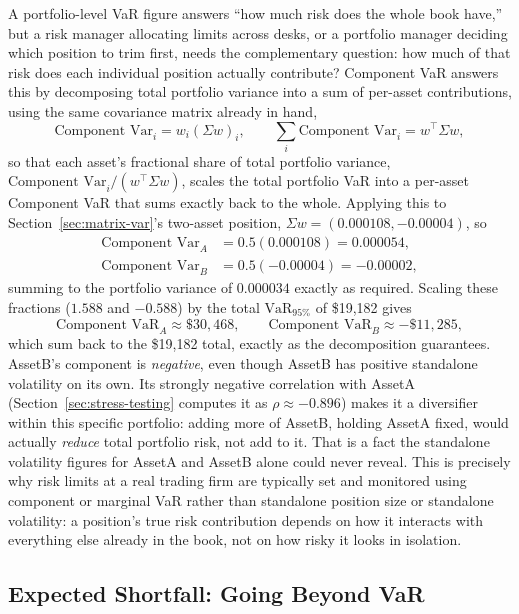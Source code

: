 \documentclass[../ai_in_finance]{subfiles}
\begin{document}
A portfolio-level VaR figure answers ``how much risk does the whole book have,'' but a risk manager allocating limits across desks, or a portfolio manager deciding which position to trim first, needs the complementary question: how much of that risk does each individual position actually contribute? Component VaR answers this by decomposing total portfolio variance into a sum of per-asset contributions, using the same covariance matrix already in hand,
\begin{equation*}
\text{Component Var}_i = w_i (\Sigma w)_i, \qquad \sum_i \text{Component Var}_i = w^\top \Sigma w,
\end{equation*}
so that each asset's fractional share of total portfolio variance, $\text{Component Var}_i / (w^\top\Sigma w)$, scales the total portfolio VaR into a per-asset Component VaR that sums exactly back to the whole. Applying this to Section~\ref{sec:matrix-var}'s two-asset position, $\Sigma w = (0.000108, -0.00004)$, so
\begin{align*}
\text{Component Var}_A &= 0.5(0.000108) = 0.000054, \\
\text{Component Var}_B &= 0.5(-0.00004) = -0.00002,
\end{align*}
summing to the portfolio variance of $0.000034$ exactly as required. Scaling these fractions ($1.588$ and $-0.588$) by the total $\text{VaR}_{95\%}$ of \$19,182 gives
\begin{equation*}
\text{Component VaR}_A \approx \$30{,}468, \qquad \text{Component VaR}_B \approx -\$11{,}285,
\end{equation*}
which sum back to the \$19,182 total, exactly as the decomposition guarantees. AssetB's component is \emph{negative}, even though AssetB has positive standalone volatility on its own. Its strongly negative correlation with AssetA (Section~\ref{sec:stress-testing} computes it as $\rho\approx-0.896$) makes it a diversifier within this specific portfolio: adding more of AssetB, holding AssetA fixed, would actually \emph{reduce} total portfolio risk, not add to it. That is a fact the standalone volatility figures for AssetA and AssetB alone could never reveal.
This is precisely why risk limits at a real trading firm are typically set and monitored using component or marginal VaR rather than standalone position size or standalone volatility: a position's true risk contribution depends on how it interacts with everything else already in the book, not on how risky it looks in isolation.

\subsection{Expected Shortfall: Going Beyond VaR}
\end{document}
